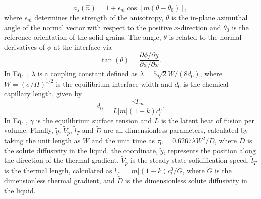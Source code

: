 \documentclass[10pt]{article}
\begin{document}
\begin{equation}
a_s(\hat{n})=1+\epsilon_m \cos[m(\theta-\theta_0)],
\end{equation}
where $\epsilon_m$ determines the strength of the anisotropy, $\theta$ is the in-plane azimuthal angle of the normal vector with respect to the positive $x$-direction and $\theta_0$ is the reference orientation of the solid grains. The angle, $\theta$ is related to the normal derivatives of $\phi$ at the interface via 
\begin{equation}
\label{taneq}
\tan(\theta) = \frac{\partial \phi / \partial y}{\partial \phi / \partial x}. 
\end{equation}
In Eq.~, $\lambda$ is a coupling constant defined as $\lambda=5\sqrt{2}W/(8d_0)$, where $W=(\sigma/H)^{1/2}$ is the equilibrium interface width and $d_0$ is the chemical capillary length, given by
\begin{equation}
\label{clength}
d_0=\frac{\gamma T_m}{L |m| (1-k) c_l^0}.
\end{equation}
In Eq. , $\gamma$ is the equilibrium surface tension and $L$ is the latent heat of fusion per volume. Finally, $\tilde{y}$, $\tilde{V}_p$, $\tilde{l}_T$ and $\tilde{D}$ are all dimensionless parameters, calculated by taking the unit length as $W$ and the unit time as $\tau_0=0.6267\lambda W^2/D$, where $D$ is the solute diffusivity in the liquid. the coordinate, $\tilde{y}$, represents the position along the direction of the thermal gradient, $\tilde{V}_p$ is the steady-state solidification speed,  $\tilde{l}_T$ is the thermal length, calculated as $\tilde{l}_T=|m|(1-k)c_l^0/\tilde{G}$, where $\tilde{G}$ is the dimensionless thermal gradient, and $\tilde{D}$ is the dimensionless solute diffusivity in the liquid.\\
\end{document}
